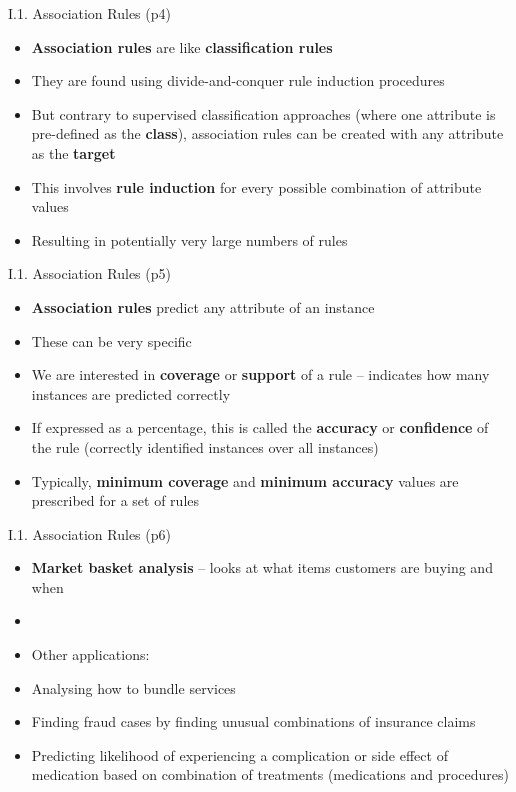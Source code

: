 \documentclass[handout]{beamer}
\newcommand{\strong}[1]{\textbf{\color{teal} #1}}
\newcommand{\stronger}[1]{\textbf{\color{purple} #1}}
\begin{document}
\begin{frame}{I.1. Association Rules (p4)}
\begin{itemize}
\item \stronger{Association rules} are like \strong{classification rules}
\item They are found using divide-and-conquer rule induction procedures
\item But contrary to supervised classification approaches (where one attribute is pre-defined as the \strong{class}), association rules can be created with any attribute as the \strong{target}
\item This involves \strong{rule induction} for every possible combination of attribute values
\item Resulting in potentially very large numbers of rules
\end{itemize}
\end{frame}
\begin{frame}{I.1. Association Rules (p5)}
\begin{itemize}
\item \strong{Association rules} predict any attribute of an instance
\item These can be very specific
\item We are interested in \stronger{coverage} or \stronger{support} of a rule -- indicates how many instances are predicted correctly 
\item If expressed as a percentage, this is called the \stronger{accuracy} or \stronger{confidence} of the rule (correctly identified instances over all instances)
\item Typically, \strong{minimum coverage} and \strong{minimum accuracy} values are prescribed for a set of rules
\end{itemize}
\end{frame}
\begin{frame}{I.1. Association Rules (p6)}
\begin{itemize}
\item \stronger{Market basket analysis} -- looks at what items customers are buying and when
\item[]
\item[] Other applications:
\item Analysing how to bundle services
\item Finding fraud cases by finding unusual combinations of insurance claims
\item Predicting likelihood of experiencing a complication or side effect of medication based on combination of treatments (medications and procedures)
\end{itemize}
\end{frame}
\end{document}
